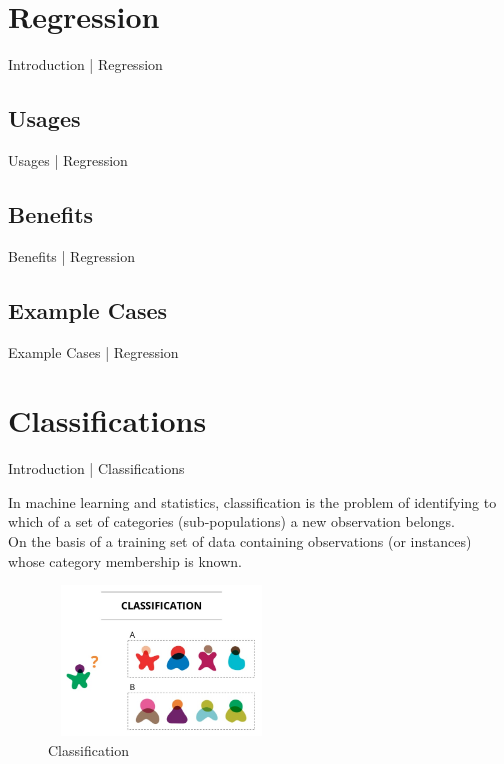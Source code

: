 \documentclass[10pt]{beamer}
\begin{document}
	\section{Regression}
		\begin{frame}{Introduction | Regression}
		\end{frame}
		\subsection{Usages}
			\begin{frame}{Usages | Regression}
			\end{frame}
		\subsection{Benefits}
			\begin{frame}{Benefits | Regression}
			\end{frame}
		\subsection{Example Cases}
			\begin{frame}{Example Cases | Regression}
			\end{frame}
	
		\section{Classifications}
		\begin{frame}{Introduction | Classifications}
			\begin{center}
				\large{In machine learning and statistics, classification is the problem of identifying to which of a set of categories (sub-populations) a new observation belongs.}\\
				\bigskip
				\small{ On the basis of a training set of data containing observations (or instances) whose category 							membership is known.}
				\begin{figure}
					\centering
					\includegraphics[width=60mm,height=40mm]{images/barun_1}
					\caption[]{Classification}
				\end{figure}
			\end{center}
			
		\end{frame}
\end{document}
